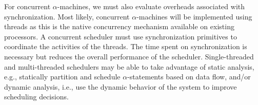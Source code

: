 For concurrent $\alpha$-machines, we must also evaluate overheads associated with synchronization.
Most likely, concurrent $\alpha$-machines will be implemented using threads as this is the native concurrency mechanism available on existing processors.
A concurrent scheduler must use synchronization primitives to coordinate the activities of the threads.
The time spent on synchronization is necessary but reduces the overall performance of the scheduler.
Single-threaded and multi-threaded schedulers may be able to take advantage of static analysis, e.g., statically partition and schedule $\alpha$-statements based on data flow, and/or dynamic analysis, i.e., use the dynamic behavior of the system to improve scheduling decisions.
